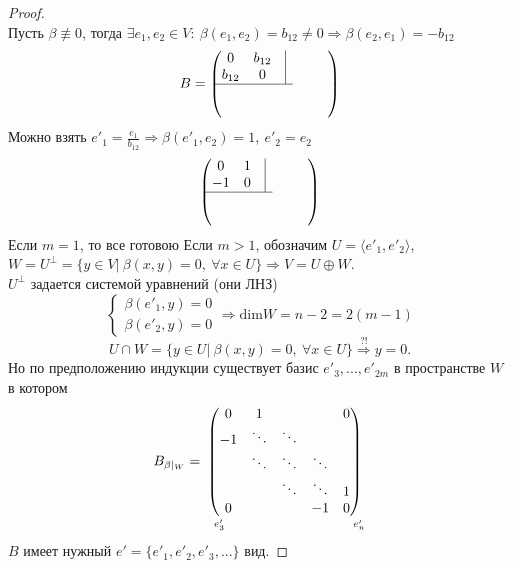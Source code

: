 \documentclass[a4paper, 12pt]{article}
\newcommand\tab[1][.5cm]{\hspace*{#1}}
\theoremstyle{definition}
\begin{document}
        \begin{proof}\tab[1cm]\\
            Пусть $\beta \not \equiv 0$,  тогда $\exists e_1,e_2 \in V:\ \beta(e_1,e_2) = b_{12} \neq 0 \Longrightarrow \beta(e_2,e_1) = - b_{12}$
            $$B = \begin{pmatrix}
                \begin{matrix}
                    0 & b_{12} & \vline\\
                    b_{12} & 0 & \vline\\
                    \hline                
                \end{matrix} & \null & \null & \null\\
                \null & \null & \null & \null\\
                \null & \null & \null & \null
            \end{pmatrix}$$ 
            Можно взять $e'_1 = \frac{e_1}{b_{12}} \Longrightarrow \beta(e'_1, e_2) = 1,\ e'_2 = e_2$ 
            $$\begin{pmatrix}
                \begin{matrix}
                    0 & 1 & \vline\\
                    -1 & 0 & \vline\\
                    \hline                
                \end{matrix} & \null & \null & \null\\
                \null & \null & \null & \null\\
                \null & \null & \null & \null
            \end{pmatrix}$$
            Если $m = 1$, то все готовою Если $m > 1$, обозначим $U = \langle e'_1, e'_2 \rangle$,\\ $W = U^\perp = \{y \in V|\ \beta(x,y) = 0,\ \forall x \in U\} \Longrightarrow V = U \oplus W$.\\
            $U^\perp $ задается системой уравнений (они ЛНЗ)
            $$\begin{cases}
                \beta(e'_1,y) = 0\\
                \beta(e'_2,y) = 0
            \end{cases} \Longrightarrow \text{dim}W = n - 2 = 2(m-1)
            $$
            $$U \cap W = \{y \in U|\ \beta(x,y) = 0,\ \forall x \in U\} \overset{?!}{\Longrightarrow}  y = 0.$$
            Но по предположению индукции существует базис $e'_3,...,e'_{2m}$  в пространстве $W$ в котором
            $$B_{\beta|_W} = \underset{\tab[0.25cm]e'_3\tab[3.25cm]e'_n}{\begin{pmatrix}
                0 & 1 & \null & \null & 0\\
                -1 & \ddots & \ddots & \null & \null\\
                \null & \ddots & \ddots & \ddots & \null\\
                \null & \null & \ddots & \ddots & 1\\
                0 & \null & \null & -1 & 0
            \end{pmatrix}}$$
            $B$ имеет нужный $e' = \{e'_1,e'_2,e'_3,...\}$ вид. 
        \end{proof}
\end{document}
